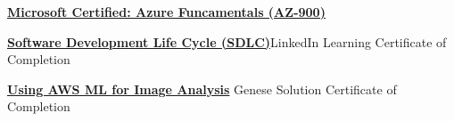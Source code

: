 \textbf{\href{}{Microsoft Certified: Azure Funcamentals (AZ-900)}} \par

\textbf{\href{https://www.linkedin.com/learning/certificates/7fd4e20599fb745c91758dec53506126945f106e1b7d8980c5c24edcbbf4e6cc}{Software Development Life Cycle (SDLC)}}LinkedIn Learning Certificate of Completion \par

\textbf{\href{}{Using AWS ML for Image Analysis}} Genese Solution Certificate of Completion \par
